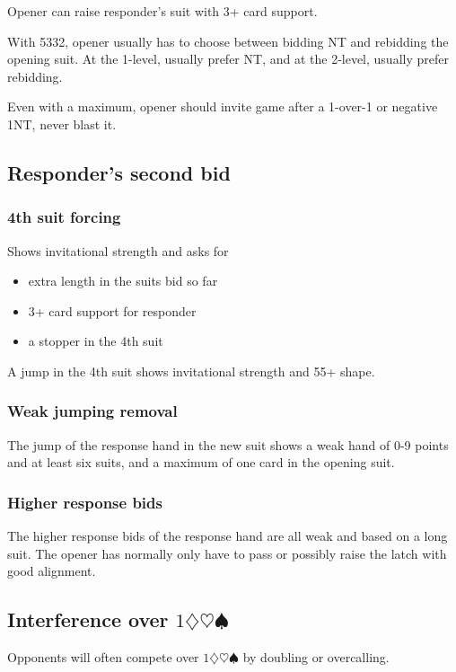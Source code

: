 \documentclass[a4paper, twoside, 11pt]{article}
\begin{document}
\begin{multicols}{3}
Opener can raise responder's suit with 3+ card support.

With 5332, opener usually has to choose between bidding NT and rebidding the opening suit. At the 1-level, usually prefer NT, and at the 2-level, usually prefer rebidding.

Even with a maximum, opener should invite game after a 1-over-1 or negative \textnormal{1NT}, never blast it.

\subsection*{Responder's second bid}

\subsubsection*{4th suit forcing}
Shows invitational strength and asks for \begin{itemize}
    \item extra length in the suits bid so far
    \item 3+ card support for responder
    \item a stopper in the 4th suit
\end{itemize}

A jump in the 4th suit shows invitational strength and 55+ shape.

\subsubsection*{Weak jumping removal}
The jump of the response hand in the new suit shows a weak
hand of 0-9 points and at least six suits, and
a maximum of one card in the opening suit.


\subsubsection*{Higher response bids}
The higher response bids of the response hand are all weak and
based on a long suit. The opener has
normally only have to pass or possibly raise
the latch with good alignment.

\subsection*{Interference over $1\diamondsuit\heartsuit\spadesuit$}
Opponents will often compete over $1\diamondsuit\heartsuit\spadesuit$ by doubling or overcalling.


\end{multicols}
\end{document}
